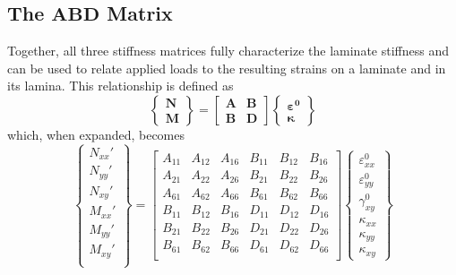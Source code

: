 \documentclass{article}
\begin{document}
  \subsection{The $\bm{ABD}$ Matrix}
  Together, all three stiffness matrices fully characterize the laminate stiffness and can be used to relate applied loads to the resulting strains on a laminate and in its lamina. This relationship is defined as
    \begin{equation}
      \left\{\begin{array}{c} \bm{N} \\ \hline \bm{M} \end{array} \right\} = \left[\begin{array}{c|c} \bm{A} & \bm{B} \\ \hline \bm{B} & \bm{D} \end{array} \right] \left\{ \begin{array}{c} \bm{\varepsilon^{0}} \\ \hline \bm{\kappa} \end{array} \right\}
    \end{equation}
  which, when expanded, becomes
  \begin{equation}
      \left\{\begin{array}{c} N_{xx}'\\
                             N_{yy}'\\
                             N_{xy}'\\
                             \hline
                             M_{xx}'\\
                             M_{yy}'\\
                             M_{xy}'\\
      \end{array} \right\} =
      \left[ \begin{array}{ccc|ccc} A_{11} & A_{12} & A_{16} & B_{11} & B_{12} & B_{16} \\
                                  A_{21} & A_{22} & A_{26} & B_{21} & B_{22} & B_{26} \\
                                  A_{61} & A_{62} & A_{66} & B_{61} & B_{62} & B_{66} \\
                                  \hline
                                  B_{11} & B_{12} & B_{16} & D_{11} & D_{12} & D_{16} \\
                                  B_{21} & B_{22} & B_{26} & D_{21} & D_{22} & D_{26} \\
                                  B_{61} & B_{62} & B_{66} & D_{61} & D_{62} & D_{66} \\
              \end{array} \right]
      \left\{ \begin{array}{c} \varepsilon_{xx}^{0} \\ \varepsilon_{yy}^{0} \\ \gamma_{xy}^{0} \\ \hline \kappa_{xx} \\ \kappa_{yy} \\ \kappa_{xy} \end{array}\right\}
  \end{equation}
\end{document}
